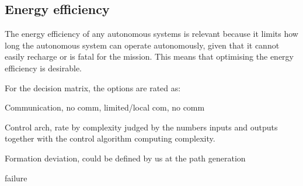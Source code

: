 \subsection{Energy efficiency}
The energy efficiency of any autonomous systems is relevant because it limits how long the autonomous system can operate autonomously, given that it cannot easily recharge or is fatal for the mission. This means that optimising the energy efficiency is desirable.


For the decision matrix, the options are rated as:

Communication, no comm, limited/local com, no comm

Control arch, rate by complexity judged by the numbers inputs and
outputs together with the control algorithm computing complexity.

Formation deviation, could be defined by us at the path generation

failure




